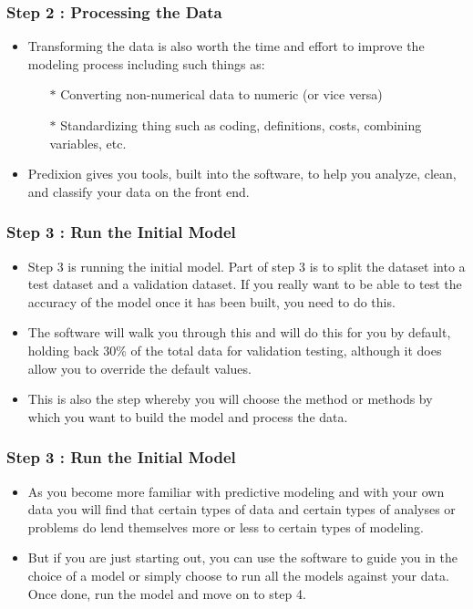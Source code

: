 \documentclass[PredictiveAnalytics101.tex]{subfiles}
\begin{document}
\begin{frame}
	\frametitle{Step 2 : Processing the Data}
\Large
\begin{itemize}
\item Transforming the
data is also worth the time and effort to improve the modeling process including such things as:
\begin{itemize}
\item[$\ast$] Converting non-numerical data to numeric (or vice versa)
\item[$\ast$] Standardizing thing such as coding, definitions, costs, combining variables, etc.
\end{itemize}
\item Predixion gives you tools, built into the software, to help you analyze, clean, and classify your data on
the front end.
\end{itemize}

\end{frame}
\begin{frame}
	\frametitle{Step 3 : Run the Initial Model}
\Large
\begin{itemize}
\item Step 3 is running the initial model. Part of step 3 is to split the dataset into a test dataset and a
validation dataset. If you really want to be able to test the accuracy of the model once it has been built,
you need to do this.
\item The software will walk you through this and will do this for you by default, holding
back 30\% of the total data for validation testing, although it does allow you to override the default
values. 
\item This is also the step whereby you will choose the method or methods by which you want to
build the model and process the data. 
\end{itemize}

\end{frame}
\begin{frame}
	\frametitle{Step 3 : Run the Initial Model}
\Large
	\begin{itemize}
\item As you become more familiar with predictive modeling and with
your own data you will find that certain types of data and certain types of analyses or problems do lend
themselves more or less to certain types of modeling. 
\item But if you are just starting out, you can use the
software to guide you in the choice of a model or simply choose to run all the models against your data.
Once done, run the model and move on to step 4.
	\end{itemize}

\end{frame}
\end{document}
